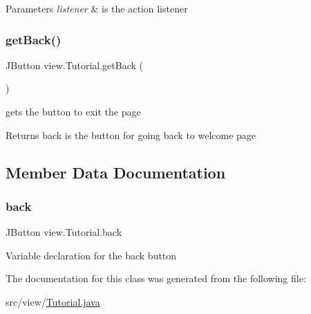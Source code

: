 \begin{DoxyParams}{Parameters}
{\em listener} & is the action listener \\
\hline
\end{DoxyParams}
\hypertarget{classview_1_1_tutorial_a612e0c4badab0a67e6e79364552b452b}{}\label{classview_1_1_tutorial_a612e0c4badab0a67e6e79364552b452b} 
\subsubsection{\texorpdfstring{get\+Back()}{getBack()}}
{\footnotesize\ttfamily J\+Button view.\+Tutorial.\+get\+Back (\begin{DoxyParamCaption}{ }\end{DoxyParamCaption})}



gets the button to exit the page 

\begin{DoxyReturn}{Returns}
back is the button for going back to welcome page 
\end{DoxyReturn}


\subsection{Member Data Documentation}
\hypertarget{classview_1_1_tutorial_a9b4a9e5388de99525cc3a982a606ea84}{}\label{classview_1_1_tutorial_a9b4a9e5388de99525cc3a982a606ea84} 
\subsubsection{\texorpdfstring{back}{back}}
{\footnotesize\ttfamily J\+Button view.\+Tutorial.\+back\hspace{0.3cm}{\ttfamily [private]}}

Variable declaration for the back button 

The documentation for this class was generated from the following file\+:\begin{DoxyCompactItemize}
\item 
src/view/\hyperlink{_tutorial_8java}{Tutorial.\+java}\end{DoxyCompactItemize}

